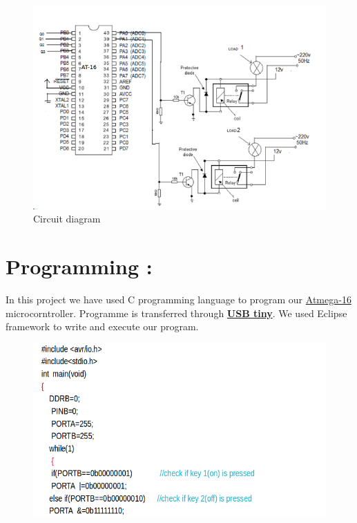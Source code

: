 \documentclass[11pt]{article}
\begin{document}
\begin{figure}[h]
	\begin{center}
		\includegraphics[scale=0.33]{circuit.png}
		\caption{\label{fig:vaquois} Circuit diagram}
	\end{center}
\end{figure}

\section{Programming :}
	In this project we have used C programming language to program our \underline{Atmega-16} microcorntroller. Programme is transferred through \textbf{\underline{USB tiny}}. We used Eclipse framework to write and execute our program.


\begin{figure}[h]
	\begin{center}
		\includegraphics[scale=0.33]{program.png}
		
	\end{center}
\end{figure}
\end{document}
